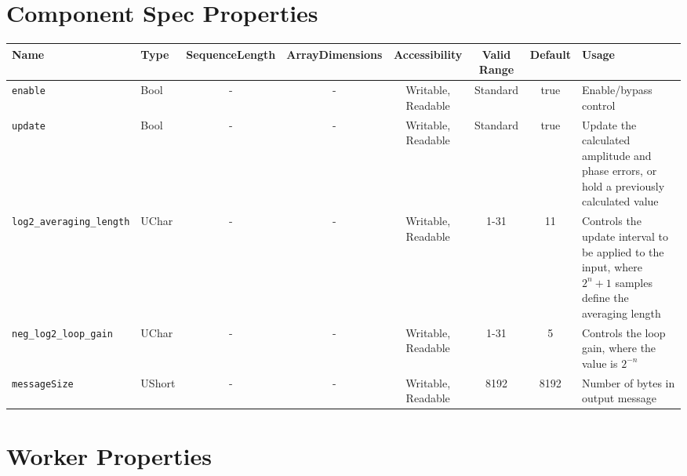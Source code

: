 \documentclass{article}
\begin{document}
	\begin{landscape}
		\section*{Component Spec Properties}
		\begin{scriptsize}
			\begin{tabular}{|p{3cm}|p{1.5cm}|c|c|c|c|c|p{7cm}|}
				\hline
				\rowcolor{blue}
				Name                         & Type   & SequenceLength & ArrayDimensions & Accessibility      & Valid Range & Default & Usage                                                                                                      \\
				\hline
				\verb+enable+                & Bool   & -              & -               & Writable, Readable & Standard    & true    & Enable/bypass control                                                                                      \\
				\hline
				\verb+update+                & Bool   & -              & -               & Writable, Readable & Standard    & true    & Update the calculated amplitude and phase errors, or hold a previously calculated value                    \\
				\hline
				\verb+log2_averaging_length+ & UChar  & -              & -               & Writable, Readable & 1-31        & 11      & Controls the update interval to be applied to the input, where $2^n+1$ samples define the averaging length \\
				\hline
				\verb+neg_log2_loop_gain+    & UChar  & -              & -               & Writable, Readable & 1-31        & 5       & Controls the loop gain, where the value is $2^{-n}$                                                        \\
				\hline
				\verb+messageSize+           & UShort & -              & -               & Writable, Readable & 8192        & 8192    & Number of bytes in output message                                                                          \\
				\hline
			\end{tabular}
		\end{scriptsize}

		\section*{Worker Properties}

\end{landscape}
\end{document}
